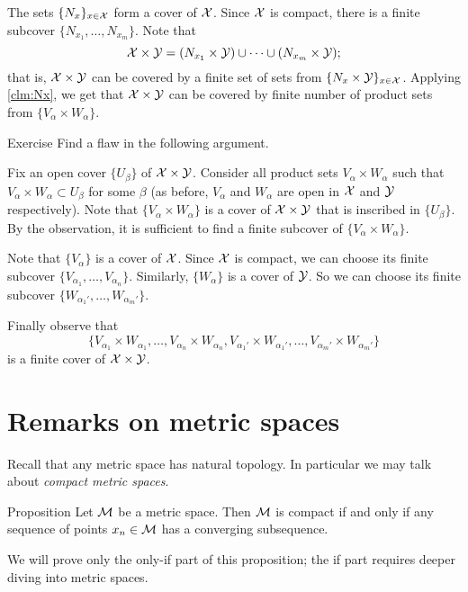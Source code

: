 The sets $\{N_x\}_{x\in\mathcal{X}}$ form a cover of $\mathcal{X}$.
Since $\mathcal{X}$ is compact, 
there is a finite subcover $\{N_{x_1},\dots,N_{x_m}\}$.
Note that 
\[\mathcal{X}\times\mathcal{Y}=(N_{x_1}\times \mathcal{Y})\cup\dots\cup (N_{x_m}\times \mathcal{Y});\]
that is, $\mathcal{X}\times\mathcal{Y}$ can be covered by a finite set of sets from $\{N_x\times \mathcal{Y}\}_{x\in\mathcal{X}}$.
Applying \ref{clm:Nx}, we get that $\mathcal{X}\times\mathcal{Y}$ can be covered by finite number of product sets from $\{V_\alpha\times W_\alpha\}$.
\qeds

\begin{thm}{Exercise}
Find a flaw in the following argument.
\end{thm}

Fix an open cover $\{U_\beta\}$ of $\mathcal{X}\times\mathcal{Y}$.
Consider all product sets $V_\alpha\times W_\alpha$ such that $V_\alpha\times W_\alpha\subset U_\beta$ for some $\beta$ (as before, $V_\alpha$ and $W_\alpha$ are open in $\mathcal{X}$ and $\mathcal{Y}$ respectively).
Note that $\{V_\alpha\times W_\alpha\}$ is a cover of $\mathcal{X}\times\mathcal{Y}$ that is inscribed in $\{U_\beta\}$.
By the observation, it is sufficient to find a finite subcover of $\{V_\alpha\times W_\alpha\}$.

Note that $\{V_\alpha\}$ is a cover of $\mathcal{X}$.
Since $\mathcal{X}$ is compact, we can choose its finite subcover $\{V_{\alpha_1},\dots,V_{\alpha_n}\}$.
Similarly, $\{W_\alpha\}$ is a cover of $\mathcal{Y}$.
So we can choose its finite subcover $\{W_{\alpha_1'},\dots,W_{\alpha_m'}\}$.

Finally observe that 
\[\{V_{\alpha_1}\times W_{\alpha_1},\dots,V_{\alpha_n}\times W_{\alpha_n},V_{\alpha_1'}\times W_{\alpha_1'},\dots,V_{\alpha_m'}\times W_{\alpha_m'}\}\] is a finite cover of $\mathcal{X}\times\mathcal{Y}$.
\qeds


\section{Remarks on metric spaces}

Recall that any metric space has natural topology.
In particular we may talk about \emph{compact metric spaces}.

\begin{thm}{Proposition}
Let $\mathcal{M}$ be a metric space.
Then $\mathcal{M}$ is compact if and only if any sequence of points $x_n\in \mathcal{M}$ has a converging subsequence.
\end{thm}

We will prove only the only-if part of this proposition;
the if part requires deeper diving into metric spaces.

